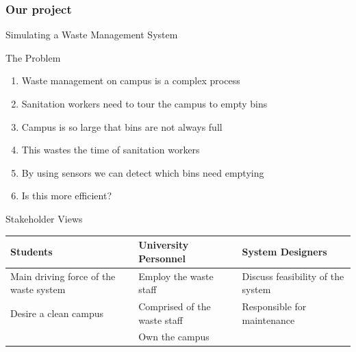 \documentclass[18pt]{beamer}
\begin{document}
    \begin{centering}
        \begin{frame}[c]{}
            \frametitle{Our project}
            Simulating a Waste Management System
        \end{frame}
    \end{centering}

    \begin{frame}{The Problem}
        \begin{enumerate}
            \item Waste management on campus is a complex process \pause
            \item Sanitation workers need to tour the campus to empty bins \pause
            \item Campus is so large that bins are not always full \pause
            \item This wastes the time of sanitation workers \pause
            \item By using sensors we can detect which bins need emptying \pause
            \item Is this more efficient?
        \end{enumerate}
    \end{frame}

    \begin{frame}{Stakeholder Views}
        \begin{center}
        \begin{tabular}{|p{} | p{} | p{}|}
            \hline
        	Students & University Personnel & System Designers \\
            \hline
        	Main driving force of the waste system & Employ the waste staff & Discuss feasibility of the system \\
            \hline
            Desire a clean campus & Comprised of the waste staff & Responsible for maintenance \\
            \hline
            & Own the campus & \\
            \hline
        \end{tabular}
        \end{center}
    \end{frame}
\end{document}
